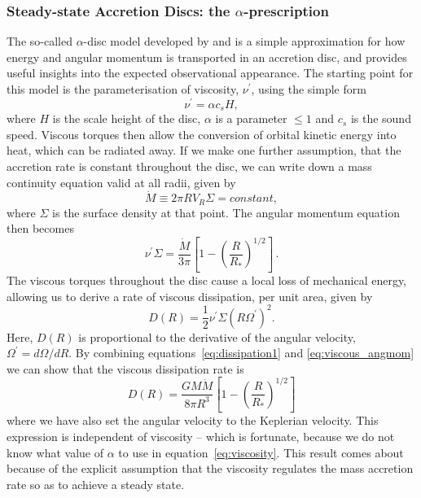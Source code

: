 \subsubsection{Steady-state Accretion Discs: the $\alpha$-prescription}

\label{sec:alpha_disc}

The so-called $\alpha$-disc model developed by 
\citet[][hereafter SS73]{shakurasunyaev1973} and \cite{lyndenbell1969} is
a simple approximation for how energy and angular momentum
is transported in an accretion disc, and provides useful insights into
the expected observational appearance. 
The starting point for this model is the parameterisation
of viscosity, $\nu^\prime$, using the simple form
\begin{equation}
\nu^\prime = \alpha c_s H,
\label{eq:viscosity}
\end{equation}
where $H$ is the scale height of the disc,
$\alpha$ is a parameter $\leq 1$ and $c_s$ is the sound speed.
Viscous torques then allow the conversion of orbital kinetic energy into heat, 
which can be radiated away. 
If we make one further assumption, that the accretion rate is
constant throughout the disc, we can write down a mass continuity equation
valid at all radii, given by
\begin{equation}
\dot{M} \equiv 2 \pi R V_R \Sigma = constant,
\end{equation}
where $\Sigma$ is the surface density at that point. 
The angular momentum equation then becomes
\begin{equation}
\nu^\prime \Sigma = \frac{\dot{M}}{3 \pi} \left[1 - \left( \frac{R}{R_*} \right)^{1/2} \right]\, .
\label{eq:viscous_angmom}
\end{equation}
The viscous torques throughout the disc cause a local loss of mechanical energy, allowing 
us to derive \citep[see, e.g.][]{fkrbook} a rate of viscous dissipation, 
per unit area, given by
\begin{equation}
D(R) = \frac{1}{2} \nu^\prime \Sigma (R \Omega^\prime)^2.
\label{eq:dissipation1}
\end{equation}
Here, $D(R)$ is proportional to the derivative of the angular velocity, $\Omega^\prime=d\Omega/dR$.
By combining equations~\ref{eq:dissipation1} and \ref{eq:viscous_angmom} we can show that the 
viscous dissipation rate is 
\begin{equation}
D(R) = \frac{G M \dot{M}}{8 \pi R^3} \left[1 - \left( \frac{R}{R_*} \right)^{1/2} \right]
\label{eq:dissipation2}
\end{equation}
where we have also set the angular velocity to the Keplerian velocity. 
This expression is independent of viscosity -- which is fortunate, because
we do not know what value of $\alpha$ to use in equation~\ref{eq:viscosity}.
This result comes about because of the explicit assumption that the viscosity regulates
the mass accretion rate so as to achieve a steady state.

